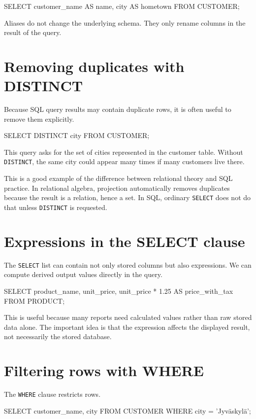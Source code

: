\documentclass[11pt,a4paper,openany]{book}
\begin{document}
\begin{codesql}
SELECT customer_name AS name, city AS hometown
FROM CUSTOMER;
\end{codesql}

Aliases do not change the underlying schema. They only rename columns in the result of the query.

\section{Removing duplicates with DISTINCT}
Because SQL query results may contain duplicate rows, it is often useful to remove them explicitly.

\begin{codesql}
SELECT DISTINCT city
FROM CUSTOMER;
\end{codesql}

This query asks for the set of cities represented in the customer table. Without \texttt{DISTINCT}, the same city could appear many times if many customers live there.

This is a good example of the difference between relational theory and SQL practice. In relational algebra, projection automatically removes duplicates because the result is a relation, hence a set. In SQL, ordinary \texttt{SELECT} does not do that unless \texttt{DISTINCT} is requested.

\section{Expressions in the SELECT clause}
The \texttt{SELECT} list can contain not only stored columns but also expressions. We can compute derived output values directly in the query.

\begin{codesql}
SELECT product_name, unit_price, unit_price * 1.25 AS price_with_tax
FROM PRODUCT;
\end{codesql}

This is useful because many reports need calculated values rather than raw stored data alone. The important idea is that the expression affects the displayed result, not necessarily the stored database.

\section{Filtering rows with WHERE}
The \texttt{WHERE} clause restricts rows.

\begin{codesql}
SELECT customer_name, city
FROM CUSTOMER
WHERE city = 'Jyväskylä';
\end{codesql}
\end{document}
